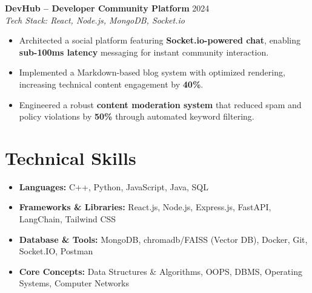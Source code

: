 \documentclass[10pt, letterpaper]{article}
\begin{document}
\noindent \textbf{DevHub -- Developer Community Platform} \hfill 2024 \\
\textit{Tech Stack: React, Node.js, MongoDB, Socket.io}
\begin{itemize}[noitemsep,topsep=0pt,parsep=0pt,partopsep=0pt,leftmargin=15pt]
    \item Architected a social platform featuring \textbf{Socket.io-powered chat}, enabling \textbf{sub-100ms latency} messaging for instant community interaction.
    \item Implemented a Markdown-based blog system with optimized rendering, increasing technical content engagement by \textbf{40\%}.
    \item Engineered a robust \textbf{content moderation system} that reduced spam and policy violations by \textbf{50\%} through automated keyword filtering.
\end{itemize}

\section{Technical Skills}
\begin{itemize}[noitemsep,topsep=0pt,parsep=0pt,partopsep=0pt,leftmargin=15pt]
    \item \textbf{Languages:} C++, Python, JavaScript, Java, SQL
    \item \textbf{Frameworks \& Libraries:} React.js, Node.js, Express.js, FastAPI, LangChain, Tailwind CSS
    \item \textbf{Database \& Tools:} MongoDB, chromadb/FAISS (Vector DB), Docker, Git, Socket.IO, Postman
    \item \textbf{Core Concepts:} Data Structures \& Algorithms, OOPS, DBMS, Operating Systems, Computer Networks
\end{itemize}
\end{document}
